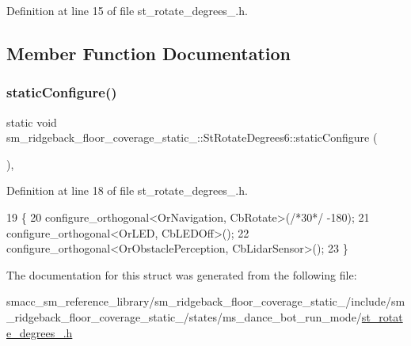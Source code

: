 Definition at line 15 of file st\+\_\+rotate\+\_\+degrees\+\_.\+h.



\subsection{Member Function Documentation}
\mbox{\label{structsm__ridgeback__floor__coverage__static__1_1_1StRotateDegrees6_a34cbdecca81ee8ab657be8af208da167}} 
\subsubsection{\texorpdfstring{static\+Configure()}{staticConfigure()}}
{\footnotesize\ttfamily static void sm\+\_\+ridgeback\+\_\+floor\+\_\+coverage\+\_\+static\+\_\+::\+St\+Rotate\+Degrees6\+::static\+Configure (\begin{DoxyParamCaption}{ }\end{DoxyParamCaption})\hspace{0.3cm}{\ttfamily [inline]}, {\ttfamily [static]}}



Definition at line 18 of file st\+\_\+rotate\+\_\+degrees\+\_.\+h.


\begin{DoxyCode}
19   \{
20     configure\_orthogonal<OrNavigation, CbRotate>(\textcolor{comment}{/*30*/} -180);
21     configure\_orthogonal<OrLED, CbLEDOff>();
22     configure\_orthogonal<OrObstaclePerception, CbLidarSensor>();
23   \}
\end{DoxyCode}


The documentation for this struct was generated from the following file\+:\begin{DoxyCompactItemize}
\item 
smacc\+\_\+sm\+\_\+reference\+\_\+library/sm\+\_\+ridgeback\+\_\+floor\+\_\+coverage\+\_\+static\+\_/include/sm\+\_\+ridgeback\+\_\+floor\+\_\+coverage\+\_\+static\+\_/states/ms\+\_\+dance\+\_\+bot\+\_\+run\+\_\+mode/\hyperlink{sm__ridgeback__floor__coverage__static__1_2include_2sm__ridgeback__floor__coverage__static__1_2s4a5906fd97cbaecb34834ca8bc335984}{st\+\_\+rotate\+\_\+degrees\+\_.\+h}\end{DoxyCompactItemize}
